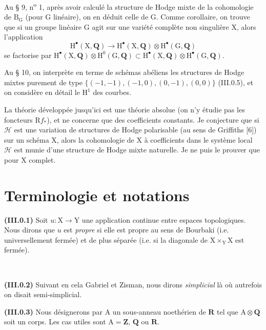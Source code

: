 \documentclass[11pt,leqno]{article}
\newcommand{\Page}[1]{\ifvmode\noindent\else\unskip\ \fi{\footnotesize\textcolor{gray}{[p.\,#1]}}\ \ignorespaces}
\begin{document}
Au § 9, n\textsuperscript{o} 1, après avoir calculé la structure de Hodge mixte de la cohomologie de \(\mathrm{B}_{\mathrm{G}}\) (pour \(\mathrm{G}\) linéaire), on en déduit celle de \(\mathrm{G}\). Comme corollaire, on trouve que si un groupe linéaire \(\mathrm{G}\) agit sur une variété complète non singulière \(\mathrm{X}\), alors l’application
\[
\mathrm{H}^{\bullet}(\mathrm{X},\mathbf{Q})
\to \mathrm{H}^{\bullet}(\mathrm{X},\mathbf{Q})
\otimes \mathrm{H}^{\bullet}(\mathrm{G},\mathbf{Q})
\]
se factorise par \(\mathrm{H}^{\bullet}(\mathrm{X},\mathbf{Q})\otimes\mathrm{H}^{0}(\mathrm{G},\mathbf{Q})\subset\mathrm{H}^{\bullet}(\mathrm{X},\mathbf{Q})\otimes\mathrm{H}^{\bullet}(\mathrm{G},\mathbf{Q})\).

Au § 10, on interprète en terme de schémas abéliens les structures de Hodge mixtes purement de type \(\{(-1,-1),(-1,0),(0,-1),(0,0)\}\) (III.0.5), et on considère en détail le \(\mathrm{H}^{1}\) des courbes.

La théorie développée jusqu’ici est une théorie absolue (on n’y étudie pas les foncteurs \(\mathrm{R}f_*\)), et ne concerne que des coefficients constants. Je conjecture que si \(\mathscr{H}\) est une variation de structures de Hodge polarisable (au sens de Griffiths [6]) sur un schéma \(\mathrm{X}\), alors la cohomologie de \(\mathrm{X}\) à coefficients dans le système local \(\mathscr{H}\) est munie d’une structure de Hodge mixte naturelle. Je ne puis le prouver que pour \(\mathrm{X}\) complet.

\section*{\centering Terminologie et notations}

\textbf{(III.0.1)} Soit \(u:\mathrm{X}\to\mathrm{Y}\) une application continue entre espaces topologiques. Nous dirons que \(u\) est \textit{propre} si elle est propre au sens de Bourbaki (i.e. universellement fermée) et de plus séparée (i.e. si la diagonale de \(\mathrm{X}\times_{\mathrm{Y}}\mathrm{X}\) est fermée).

\Page{8}

\textbf{(III.0.2)} Suivant en cela Gabriel et Zisman, nous dirons \textit{simplicial} là où autrefois on disait semi-simplicial.

\textbf{(III.0.3)} Nous désignerons par \(\mathrm{A}\) un sous-anneau noethérien de \(\mathbf{R}\) tel que \(\mathrm{A}\otimes\mathbf{Q}\) soit un corps. Les cas utiles sont \(\mathrm{A}=\mathbf{Z}\), \(\mathbf{Q}\) ou \(\mathbf{R}\).
\end{document}
